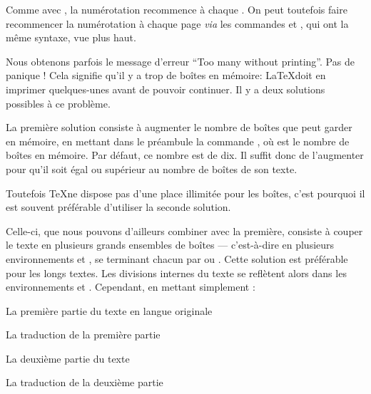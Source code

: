 \begin{attention}
Comme avec , la numérotation recommence à chaque . On peut toutefois faire recommencer la numérotation  à chaque page \emph{via} les commandes  et , qui ont la même syntaxe, vue plus haut. 
\end{attention}

Nous obtenons parfois le message d'erreur \enquote{Too many  without printing}. Pas de panique ! Cela signifie qu'il y a trop de boîtes en mémoire: \LaTeX  doit en imprimer quelques-unes avant de pouvoir continuer.  Il y a deux solutions possibles à ce problème.

La première solution consiste à  augmenter le nombre de boîtes que  peut garder en mémoire, en mettant dans le préambule la commande , où  est le nombre de boîtes en mémoire. Par défaut, ce nombre est de dix. Il suffit donc de l'augmenter  pour qu'il soit égal ou supérieur au nombre de boîtes de son  texte. 

Toutefois \TeX ne dispose pas d'une place illimitée pour les boîtes, c'est pourquoi il est souvent préférable d'utiliser la seconde solution.


Celle-ci, que nous pouvons d'ailleurs combiner avec la première, consiste à  couper le texte en plusieurs grands ensembles de boîtes --- c'est-à-dire en plusieurs environnements  et , se terminant chacun par  ou .  Cette solution est préférable pour les longs textes. Les divisions internes du texte se reflètent alors dans les environnements  et . Cependant,  en mettant simplement :

\begin{latexcode}
\begin{pages}  
\begin{Leftside}  \beginnumbering 
La première partie du texte en langue originale
\endnumbering  \end{Leftside} 
 
\begin{Rightside} \beginnumbering
La traduction de la première partie
\endnumbering \end{Rightside} 
 \Pages
 
\begin{Leftside} \beginnumbering  
La deuxième partie du texte 
\endnumbering  \end{Leftside} 
 
\begin{Rightside}  \beginnumbering
La traduction de la deuxième partie
\endnumbering \end{Rightside} 
 \Pages

  \end{pages}
\end{latexcode}

